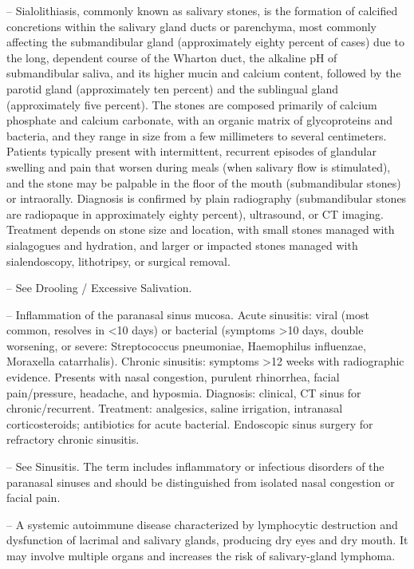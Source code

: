 -- Sialolithiasis, commonly known as salivary stones, is the formation of calcified concretions within the salivary gland ducts or parenchyma, most commonly affecting the submandibular gland (approximately eighty percent of cases) due to the long, dependent course of the Wharton duct, the alkaline pH of submandibular saliva, and its higher mucin and calcium content, followed by the parotid gland (approximately ten percent) and the sublingual gland (approximately five percent). The stones are composed primarily of calcium phosphate and calcium carbonate, with an organic matrix of glycoproteins and bacteria, and they range in size from a few millimeters to several centimeters. Patients typically present with intermittent, recurrent episodes of glandular swelling and pain that worsen during meals (when salivary flow is stimulated), and the stone may be palpable in the floor of the mouth (submandibular stones) or intraorally. Diagnosis is confirmed by plain radiography (submandibular stones are radiopaque in approximately eighty percent), ultrasound, or CT imaging. Treatment depends on stone size and location, with small stones managed with sialagogues and hydration, and larger or impacted stones managed with sialendoscopy, lithotripsy, or surgical removal.

-- See Drooling / Excessive Salivation.

-- Inflammation of the paranasal sinus mucosa. Acute sinusitis: viral (most common, resolves in <10 days) or bacterial (symptoms >10 days, double worsening, or severe: Streptococcus pneumoniae, Haemophilus influenzae, Moraxella catarrhalis). Chronic sinusitis: symptoms >12 weeks with radiographic evidence. Presents with nasal congestion, purulent rhinorrhea, facial pain/pressure, headache, and hyposmia. Diagnosis: clinical, CT sinus for chronic/recurrent. Treatment: analgesics, saline irrigation, intranasal corticosteroids; antibiotics for acute bacterial. Endoscopic sinus surgery for refractory chronic sinusitis.

-- See Sinusitis. The term includes inflammatory or infectious disorders of the paranasal sinuses and should be distinguished from isolated nasal congestion or facial pain.

-- A systemic autoimmune disease characterized by lymphocytic destruction and dysfunction of lacrimal and salivary glands, producing dry eyes and dry mouth. It may involve multiple organs and increases the risk of salivary-gland lymphoma.


